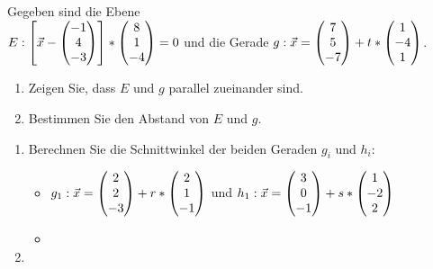 Gegeben sind die Ebene \\$E: \left[ \vec x -  \begin{pmatrix} -1 \\ 4\\ -3 \end{pmatrix}\right]*\begin{pmatrix} 8\\ 1 \\-4 \end{pmatrix}=0$ und die Gerade $g: \vec x=\begin{pmatrix} 7\\5\\-7 \end{pmatrix}+t*\begin{pmatrix} 1\\-4\\1 \end{pmatrix}$.
\begin{enumerate}
	\item Zeigen Sie, dass $E$ und $g$ parallel zueinander sind.
	\item Bestimmen Sie den Abstand von $E$ und $g$.
\end{enumerate}

\begin{enumerate}
	\item Berechnen Sie die Schnittwinkel der beiden Geraden $g_i$ und $h_i$:
	\begin{itemize}
		\item $g_1: \vec x = \begin{pmatrix} 2\\2\\-3 \end{pmatrix} + r*\begin{pmatrix} 2\\1\\-1 \end{pmatrix}$ und $h_1: \vec x = \begin{pmatrix} 3\\0\\-1 \end{pmatrix} + s* \begin{pmatrix} 1\\-2\\2 \end{pmatrix}$
		\item
	\end{itemize}
	\item
\end{enumerate}



